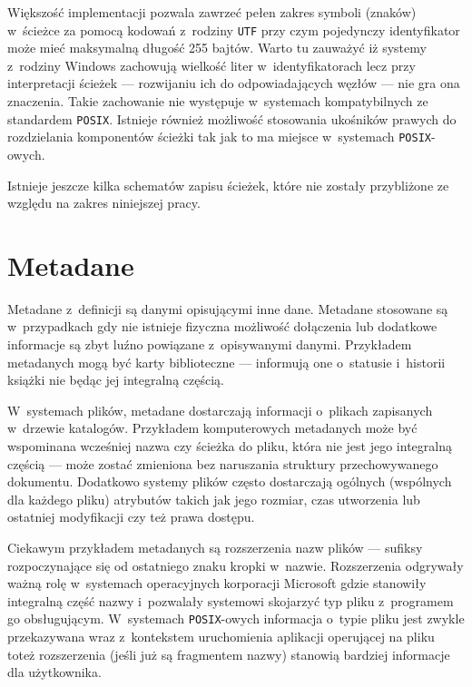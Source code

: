 \par
Większość implementacji pozwala zawrzeć pełen zakres symboli (znaków) w~ścieżce za pomocą kodowań z~rodziny \texttt{UTF} przy czym pojedynczy identyfikator może mieć maksymalną długość 255 bajtów\cite{wiki:path}.
Warto tu zauważyć iż systemy z~rodziny Windows zachowują wielkość liter w~identyfikatorach lecz przy interpretacji ścieżek --- rozwijaniu ich do odpowiadających węzłów --- nie gra ona znaczenia. Takie zachowanie nie występuje w~systemach kompatybilnych ze standardem \texttt{POSIX}. Istnieje również możliwość stosowania ukośników prawych do rozdzielania komponentów ścieżki tak jak to ma miejsce w~systemach \texttt{POSIX}-owych.

\par
Istnieje jeszcze kilka schematów zapisu ścieżek, które nie zostały przybliżone ze względu na zakres niniejszej pracy.

\clearpage

\section{Metadane}
\par
Metadane z~definicji są danymi opisującymi inne dane. Metadane stosowane są w~przypadkach gdy nie istnieje fizyczna możliwość dołączenia lub dodatkowe informacje są zbyt luźno powiązane z~opisywanymi danymi.
Przykładem metadanych mogą być karty biblioteczne --- informują one o~statusie i~historii książki nie będąc jej integralną częścią.

\par
W~systemach plików, metadane dostarczają informacji o~plikach zapisanych w~drzewie katalogów.
Przykładem komputerowych metadanych może być wspominana wcześniej nazwa czy ścieżka do pliku, która nie jest jego integralną częścią --- może zostać zmieniona bez naruszania struktury przechowywanego dokumentu.
Dodatkowo systemy plików często dostarczają ogólnych (wspólnych dla każdego pliku) atrybutów takich jak jego rozmiar, czas utworzenia lub ostatniej modyfikacji czy też prawa dostępu.
\par
Ciekawym przykładem metadanych są rozszerzenia nazw plików --- sufiksy rozpoczynające się od ostatniego znaku kropki w~nazwie. Rozszerzenia odgrywały ważną rolę w~systemach operacyjnych korporacji Microsoft gdzie stanowiły integralną część nazwy i~pozwalały systemowi skojarzyć typ pliku z~programem go obsługującym. W~systemach \texttt{POSIX}-owych informacja o~typie pliku jest zwykle przekazywana wraz z~kontekstem uruchomienia aplikacji operującej na pliku toteż rozszerzenia (jeśli już są fragmentem nazwy) stanowią bardziej informacje dla użytkownika.

